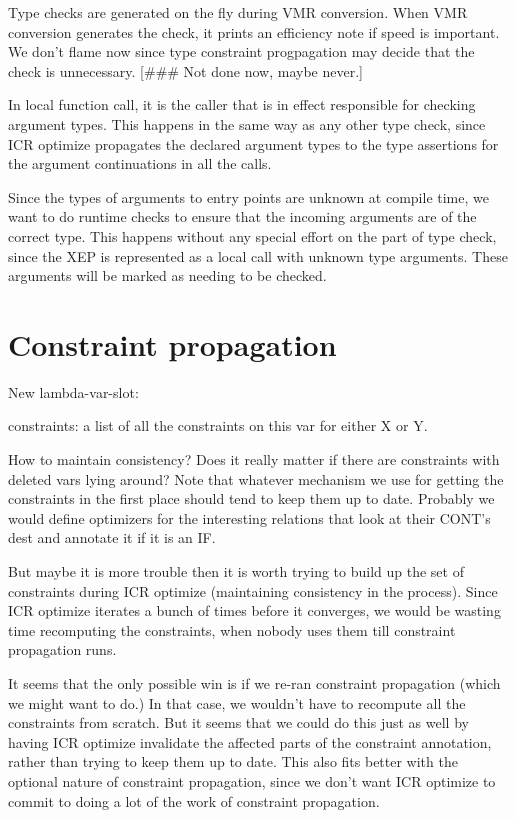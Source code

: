 Type checks are generated on the fly during VMR conversion.  When VMR
conversion generates the check, it prints an efficiency note if speed is
important.  We don't flame now since type constraint progpagation may decide
that the check is unnecessary.  [\#\#\# Not done now, maybe never.]

In local function call, it is the caller that is in effect responsible for
checking argument types.  This happens in the same way as any other type check,
since ICR optimize propagates the declared argument types to the type
assertions for the argument continuations in all the calls.

Since the types of arguments to entry points are unknown at compile time, we
want to do runtime checks to ensure that the incoming arguments are of the
correct type.  This happens without any special effort on the part of type
check, since the XEP is represented as a local call with unknown type
arguments.  These arguments will be marked as needing to be checked.

\chapter{Constraint propagation}

New lambda-var-slot:

constraints: a list of all the constraints on this var for either X or Y.

How to maintain consistency?  Does it really matter if there are constraints
with deleted vars lying around?  Note that whatever mechanism we use for
getting the constraints in the first place should tend to keep them up to date.
Probably we would define optimizers for the interesting relations that look at
their CONT's dest and annotate it if it is an IF.

But maybe it is more trouble then it is worth trying to build up the set of
constraints during ICR optimize (maintaining consistency in the process).
Since ICR optimize iterates a bunch of times before it converges, we would be
wasting time recomputing the constraints, when nobody uses them till constraint
propagation runs.  

It seems that the only possible win is if we re-ran constraint propagation
(which we might want to do.)  In that case, we wouldn't have to recompute all
the constraints from scratch.  But it seems that we could do this just as well
by having ICR optimize invalidate the affected parts of the constraint
annotation, rather than trying to keep them up to date.  This also fits better
with the optional nature of constraint propagation, since we don't want ICR
optimize to commit to doing a lot of the work of constraint propagation.  

